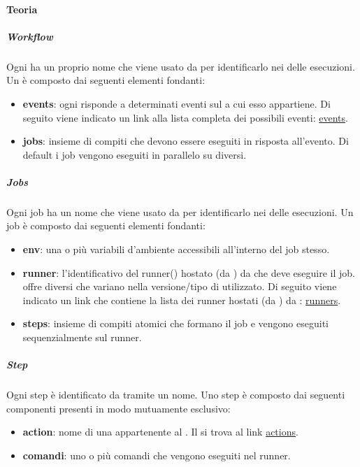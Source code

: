 \paragraph{Teoria}

\subparagraph{Workflow}
Ogni  ha un proprio nome che viene usato da  per identificarlo nei  delle esecuzioni.
Un  è composto dai seguenti elementi fondanti:
\begin{itemize}
    \item \textbf{events}: ogni  risponde a determinati eventi sul  a cui esso appartiene.
    Di seguito viene indicato un link alla lista completa dei possibili eventi: \href{https://docs.github.com/en/actions/writing-workflows/choosing-when-your-workflow-runs/events-that-trigger-workflows}{events}.

    \item \textbf{jobs}: insieme di compiti che devono essere eseguiti in risposta all'evento.
    Di default i job vengono eseguiti in parallelo su  diversi.
\end{itemize}

\subparagraph{Jobs}
Ogni job ha un nome che viene usato da  per identificarlo nei  delle esecuzioni.
Un job è composto dai seguenti elementi fondanti:

\begin{itemize}
    \item \textbf{env}: una o più variabili d'ambiente accessibili all'interno del job stesso.
    \item \textbf{runner}: l'identificativo del runner() hostato (da ) da  che deve eseguire il job.
     offre diversi  che variano nella versione/tipo di  utilizzato.
    Di seguito viene indicato un link che contiene la lista dei runner hostati (da ) da : \href{https://docs.github.com/en/actions/writing-workflows/workflow-syntax-for-github-actions#choosing-github-hosted-runners}{runners}. 
    \item \textbf{steps}: insieme di compiti atomici che formano il job e vengono eseguiti  sequenzialmente sul runner.
\end{itemize}

\subparagraph{Step}
Ogni step è identificato da  tramite un nome.
Uno step è composto dai seguenti componenti presenti in modo mutuamente esclusivo:
\begin{itemize}
    \item \textbf{action}: nome di una  appartenente al .
    Il  si trova al link \href{https://github.com/marketplace?type=actions}{actions}.
    
    \item \textbf{comandi}: uno o più comandi che vengono eseguiti nel runner.
\end{itemize}

